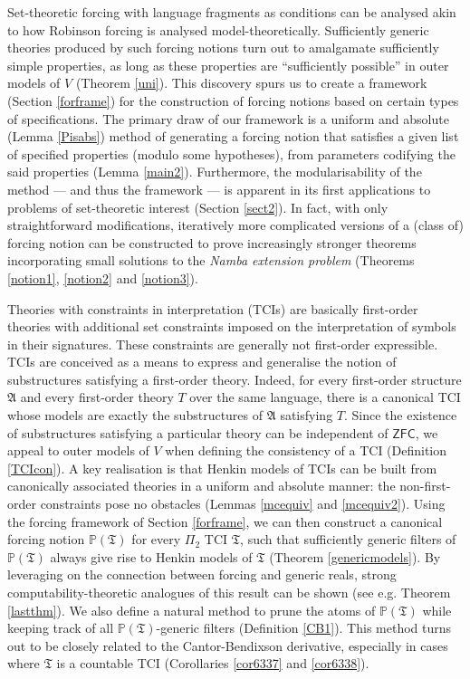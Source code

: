\documentclass[12pt, twoside]{memoir}
\numberwithin{equation}{section}
\theoremstyle{definition}
\theoremstyle{remark}
\theoremstyle{definition}
\theoremstyle{definition}
\theoremstyle{definition}
\theoremstyle{remark}
\begin{document}
Set-theoretic forcing with language fragments as conditions can be analysed akin to how Robinson forcing is analysed model-theoretically. Sufficiently generic theories produced by such forcing notions turn out to amalgamate sufficiently simple properties, as long as these properties are ``sufficiently possible'' in outer models of $V$ (Theorem \ref{uni}). This discovery spurs us to create a framework (Section \ref{forframe}) for the construction of forcing notions based on certain types of specifications. The primary draw of our framework is a uniform and absolute (Lemma \ref{Pisabs}) method of generating a forcing notion that satisfies a given list of specified properties (modulo some hypotheses), from parameters codifying the said properties (Lemma \ref{main2}). Furthermore, the modularisability of the method --- and thus the framework --- is apparent in its first applications to problems of set-theoretic interest (Section \ref{sect2}). In fact, with only straightforward modifications, iteratively more complicated versions of a (class of) forcing notion can be constructed to prove increasingly stronger theorems incorporating small solutions to the \textit{Namba extension problem} (Theorems \ref{notion1}, \ref{notion2} and \ref{notion3}).

Theories with constraints in interpretation (TCIs) are basically first-order theories with additional set constraints imposed on the interpretation of symbols in their signatures. These constraints are generally not first-order expressible. TCIs are conceived as a means to express and generalise the notion of substructures satisfying a first-order theory. Indeed, for every first-order structure $\mathfrak{A}$ and every first-order theory $T$ over the same language, there is a canonical TCI whose models are exactly the substructures of $\mathfrak{A}$ satisfying $T$. Since the existence of substructures satisfying a particular theory can be independent of $\mathsf{ZFC}$, we appeal to outer models of $V$ when defining the consistency of a TCI (Definition \ref{TCIcon}). A key realisation is that Henkin models of TCIs can be built from canonically associated theories in a uniform and absolute manner: the non-first-order constraints pose no obstacles (Lemmas \ref{mcequiv} and \ref{mcequiv2}). Using the forcing framework of Section \ref{forframe}, we can then construct a canonical forcing notion $\mathbb{P}(\mathfrak{T})$ for every $\Pi_2$ TCI $\mathfrak{T}$, such that sufficiently generic filters of $\mathbb{P}(\mathfrak{T})$ always give rise to Henkin models of $\mathfrak{T}$ (Theorem \ref{genericmodels}). By leveraging on the connection between forcing and generic reals, strong computability-theoretic analogues of this result can be shown (see e.g. Theorem \ref{lastthm}). We also define a natural method to prune the atoms of $\mathbb{P}(\mathfrak{T})$ while keeping track of all $\mathbb{P}(\mathfrak{T})$-generic filters (Definition \ref{CB1}). This method turns out to be closely related to the Cantor-Bendixson derivative, especially in cases where $\mathfrak{T}$ is a countable TCI (Corollaries \ref{cor6337} and \ref{cor6338}).
\end{document}
